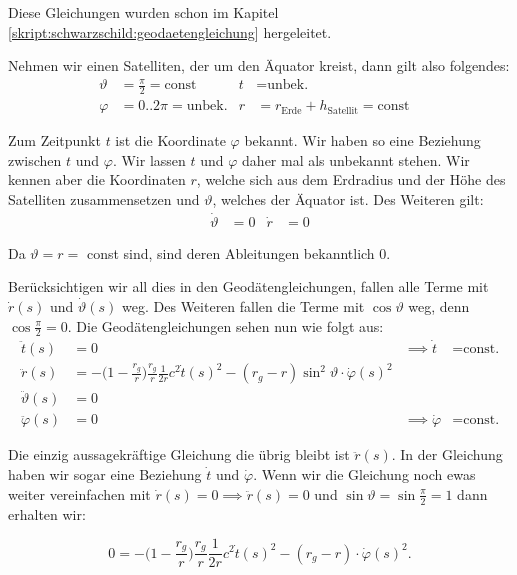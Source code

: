 \begin{refsection}
\noindent{}Diese Gleichungen wurden schon im Kapitel \ref{skript:schwarzschild:geodaetengleichung} hergeleitet. 

Nehmen wir einen Satelliten, der um den Äquator kreist, dann gilt also folgendes:
\begin{align*}
\vartheta &= \frac{\pi}{2} = \text{const} & 
t & = \text{unbek.} & \\
\varphi &= 0..2\pi = \text{unbek.} &
r &= r_{\text{Erde}} + h_{\text{Satellit}} = \text{const}
\end{align*}

\noindent{}Zum Zeitpunkt $t$ ist die Koordinate $\varphi$ bekannt. Wir haben so eine Beziehung zwischen $t$ und $\varphi$. Wir lassen $t$ und \( \varphi \) daher mal als unbekannt stehen. Wir kennen aber die Koordinaten \( r \), welche sich aus dem Erdradius und der Höhe des Satelliten zusammensetzen und \( \vartheta \), welches der Äquator ist. Des Weiteren gilt:
\begin{align*}
\dot \vartheta &= 0 & 
\dot r &= 0
\end{align*}

\noindent{}Da $\vartheta = r =$ const sind, sind deren Ableitungen bekanntlich 0.

Berücksichtigen wir all dies in den Geodätengleichungen, fallen alle Terme mit \( \dot r(s) \) und \( \dot \vartheta (s) \) weg. Des Weiteren fallen die Terme mit \( \cos \vartheta \) weg, denn \( \cos \frac{\pi}{2} = 0 \). Die Geodätengleichungen sehen nun wie folgt aus:
\begin{align*}
\ddot t(s) &= 0 & \implies \dot t &= \text{const.}\\
\ddot r(s)
&=
-\biggl(1-\frac{r_g}{r}\biggr)\frac{r_g}{r}\frac1{2r}c^2\dot t(s)^2
- (r_g-r)\sin^2 \vartheta \cdot \dot \varphi(s)^2 \\
\ddot \vartheta(s) &= 0 \\
\ddot \varphi(s) &= 0 & \implies \dot \varphi & = \text{const.}
\end{align*}

\noindent{}Die einzig aussagekräftige Gleichung die übrig bleibt ist \( \ddot r(s) \). In der Gleichung haben wir sogar eine Beziehung \( \dot t \) und \( \dot \varphi \). Wenn wir die Gleichung noch ewas weiter vereinfachen mit \( \dot r(s) = 0 \implies \ddot r(s) = 0 \) und \( \sin \vartheta = \sin \frac{\pi}{2} = 1 \) dann erhalten wir:

\begin{equation}
0 = -\biggl(1-\frac{r_g}{r}\biggr)\frac{r_g}{r}\frac1{2r}c^2\dot t(s)^2 - (r_g-r)\cdot \dot \varphi(s)^2.
\end{equation}


\end{refsection}
